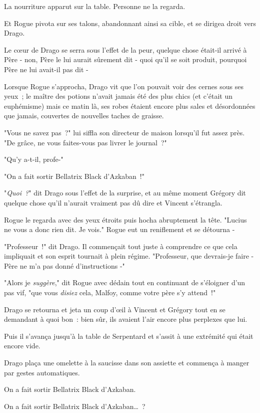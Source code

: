 La nourriture apparut sur la table. Personne ne la regarda.

Et Rogue pivota sur ses talons, abandonnant ainsi sa cible, et se dirigea droit vers Drago.

Le cœur de Drago se serra sous l'effet de la peur, quelque chose était-il arrivé à Père - non, Père le lui aurait sûrement dit - quoi qu'il se soit produit, pourquoi Père ne lui avait-il pas dit -

Lorsque Rogue s'approcha, Drago vit que l'on pouvait voir des cernes sous ses yeux~; le maître des potions n'avait jamais été des plus chics (et c'était un euphémisme) mais ce matin là, ses robes étaient encore plus sales et désordonnées que jamais, couvertes de nouvelles taches de graisse.

"Vous ne savez pas~?" lui siffla son directeur de maison lorsqu'il fut assez près. "De grâce, ne vous faites-vous pas livrer le journal~?"

"Qu'y a-t-il, profe-"

"On a fait sortir Bellatrix Black d'Azkaban~!"

"\emph{Quoi~?}" dit Drago sous l'effet de la surprise, et au même moment Grégory dit quelque chose qu'il n'aurait vraiment pas dû dire et Vincent s'étrangla.

Rogue le regarda avec des yeux étroits puis hocha abruptement la tête. "Lucius ne vous a donc rien dit. Je vois." Rogue eut un reniflement et se détourna -

"Professeur~!" dit Drago. Il commençait tout juste à comprendre ce que cela impliquait et son esprit tournait à plein régime. "Professeur, que devrais-je faire - Père ne m'a pas donné d'instructions -"

"Alors je \emph{suggère}," dit Rogue avec dédain tout en continuant de s'éloigner d'un pas vif, "que vous \emph{disiez} cela, Malfoy, comme votre père s'y attend~!"

Drago se retourna et jeta un coup d'œil à Vincent et Grégory tout en se demandant à quoi bon~: bien sûr, ils avaient l'air encore plus perplexes que lui.

Puis il s'avança jusqu'à la table de Serpentard et s'assit à une extrémité qui était encore vide.

Drago plaça une omelette à la saucisse dans son assiette et commença à manger par gestes automatiques.

On a fait sortir Bellatrix Black d'Azkaban.

On a fait sortir Bellatrix Black d'Azkaban…~?

